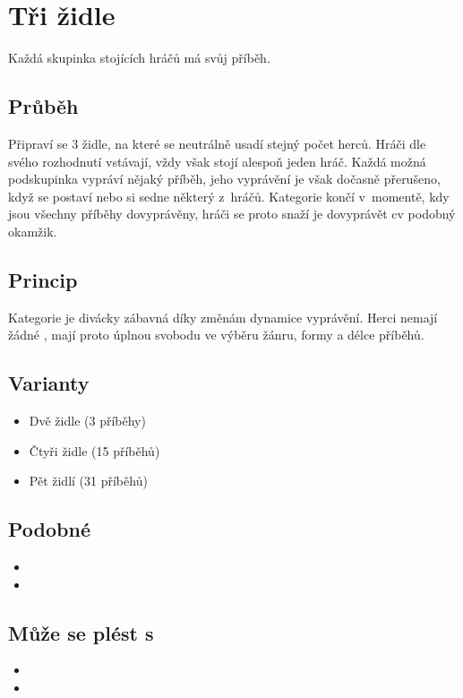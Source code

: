  
 
 
\needspace{5cm} \section{Tři židle} \label{tři židle}  
 
Každá skupinka stojících hráčů má svůj příběh. 
 
\subsection{Průběh} Připraví se 3 židle, na které se neutrálně usadí stejný počet herců. 
Hráči dle svého rozhodnutí vstávají, vždy však stojí alespoň jeden hráč. Každá možná podskupinka vypráví nějaký příběh, jeho vyprávění je však dočasně přerušeno, když se postaví nebo si sedne některý z~hráčů.   
Kategorie končí v~momentě, kdy jsou všechny příběhy dovyprávěny, hráči se proto snaží je dovyprávět cv podobný okamžik. 
 
\subsection{Princip} Kategorie je divácky zábavná díky změnám dynamice vyprávění. Herci nemají žádné , mají proto úplnou svobodu ve výběru  žánru, formy a délce příběhů. 
 
\subsection{Varianty} \begin{itemize}
\item  Dvě židle (3 příběhy)
\item  Čtyři židle (15 příběhů)
\item   Pět židlí (31 příběhů)
\end{itemize}
 
\subsection{Podobné} \begin{itemize}
\item  {}
\item  {}
\end{itemize}
 
\subsection{ Může se plést s~} \begin{itemize}
\item  {}
\item  {}
\end{itemize}
 
